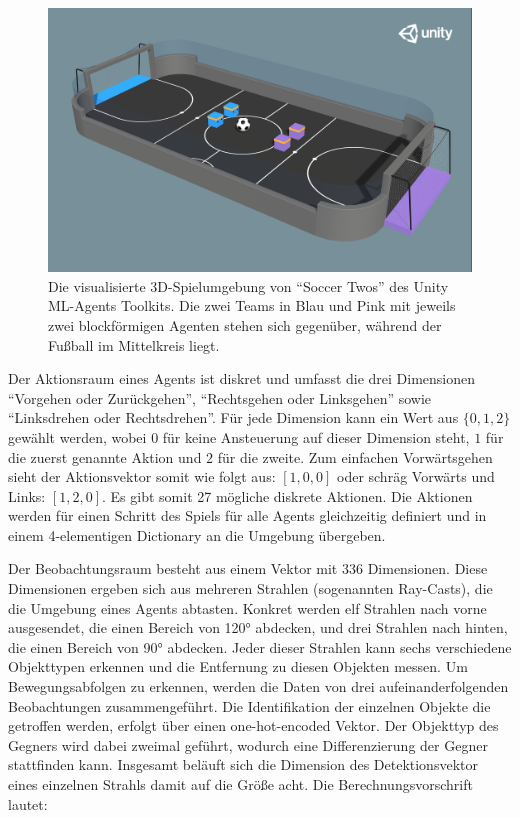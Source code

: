 \documentclass[twocolumn]{webofc}
\begin{document}
\begin{figure}
  \centering
  \includegraphics[width=\columnwidth]{img/soccer_twos.png}
  \caption{Die visualisierte 3D-Spielumgebung von \enquote{Soccer Twos} des Unity \ac{ML}-Agents Toolkits. Die zwei Teams in Blau und Pink mit jeweils zwei blockförmigen Agenten stehen sich gegenüber, während der Fußball im Mittelkreis liegt. \cite{juliani2020}}
  \label{fig:soccer_twos_3d}
\end{figure}

Der Aktionsraum eines Agents ist diskret und umfasst die drei Dimensionen \enquote{Vorgehen oder Zurückgehen}, \enquote{Rechtsgehen oder Linksgehen} sowie \enquote{Linksdrehen oder Rechtsdrehen}. Für jede Dimension kann ein Wert aus \(\{0,1, 2\}\) gewählt werden, wobei \(0\) für keine Ansteuerung auf dieser Dimension steht, \(1\) für die zuerst genannte Aktion und \(2\) für die zweite. Zum einfachen Vorwärtsgehen sieht der Aktionsvektor somit wie folgt aus: \([1, 0, 0]\) oder schräg Vorwärts und Links: \([1, 2, 0]\). Es gibt somit 27 mögliche diskrete Aktionen.
Die Aktionen werden für einen Schritt des Spiels für alle Agents gleichzeitig definiert und in einem 4-elementigen Dictionary an die Umgebung übergeben.

Der Beobachtungsraum besteht aus einem Vektor mit 336 Dimensionen. Diese Dimensionen ergeben sich aus mehreren Strahlen (sogenannten Ray-Casts), die die Umgebung eines Agents abtasten. Konkret werden elf Strahlen nach vorne ausgesendet, die einen Bereich von 120° abdecken, und drei Strahlen nach hinten, die einen Bereich von 90° abdecken. Jeder dieser Strahlen kann sechs verschiedene Objekttypen erkennen und die Entfernung zu diesen Objekten messen. Um Bewegungsabfolgen zu erkennen, werden die Daten von drei aufeinanderfolgenden Beobachtungen zusammengeführt. Die Identifikation der einzelnen Objekte die getroffen werden, erfolgt über einen one-hot-encoded Vektor. Der Objekttyp des Gegners wird dabei zweimal geführt, wodurch eine Differenzierung der Gegner stattfinden kann. Insgesamt beläuft sich die Dimension des Detektionsvektor eines einzelnen Strahls damit auf die Größe acht. Die Berechnungsvorschrift lautet:
\end{document}
